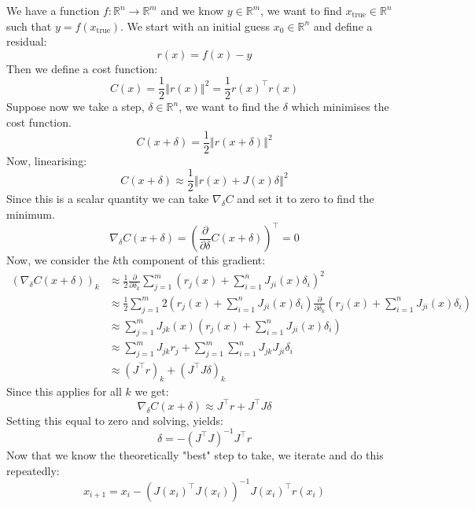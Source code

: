 We have a function $f : \mathbb{R}^n \rightarrow \mathbb{R}^m$ and we know $y \in \mathbb{R}^m$, we want to find $x_{\text{true}} \in \mathbb{R}^n$ such that $y = f(x_{\text{true}})$. We start with an initial guess $x_0 \in \mathbb{R}^n$ and define a residual:
\begin{equation}
  r(x) = f(x) - y
\end{equation}
Then we define a cost function: 
\begin{equation}
  C(x) = \frac{1}{2} \left \Vert r(x) \right \Vert^2 = \frac{1}{2} r(x)^{\top}r(x)
  \label{eq:cost_function}
\end{equation}
Suppose now we take a step, $\delta \in \mathbb{R}^n$, we want to find the $\delta$ which minimises the cost function.
\begin{equation}
  C(x + \delta) = \frac{1}{2} \left\Vert r(x + \delta) \right\Vert^2 
\end{equation}
Now, linearising:
\begin{equation}
  C(x + \delta) \approx \frac{1}{2} \left\Vert r(x) + J(x)\delta \right\Vert^2 
\end{equation}
Since this is a scalar quantity we can take $\nabla_\delta C$ and set it to zero to find the minimum.
\begin{equation}
  \nabla_\delta C(x + \delta) = \left(\frac{\partial}{\partial \delta} C(x + \delta)\right)^\top = 0
\end{equation}
Now, we consider the $k$th component of this gradient:
\begin{align}
  \left(\nabla_\delta C(x + \delta)\right)_k
    &\approx \frac{1}{2}\frac{\partial}{\partial \delta_k} \sum_{j = 1}^{m} \left(r_j(x) + \sum_{i=1}^n J_{ji}(x)\delta_i \right)^2 \\
    &\approx \frac{1}{2} \sum_{j = 1}^m 2\left(r_j(x) + \sum_{i=1}^n J_{ji}(x)\delta_i\right)\frac{\partial}{\partial \delta_k}\left(r_j(x) + \sum_{i=1}^n J_{ji}(x)\delta_i\right) \\
    &\approx \sum_{j = 1}^m J_{jk}(x)\left(r_j(x) + \sum_{i=1}^n J_{ji}(x)\delta_i\right) \\
    &\approx \sum_{j = 1}^m J_{jk} r_j + \sum_{j = 1}^m \sum_{i=1}^n J_{jk} J_{ji}\delta_i \\
    &\approx \left( J^\top r \right)_k + (J^\top J \delta)_k
\end{align}
Since this applies for all $k$ we get:
\begin{equation}
  \nabla_\delta C(x + \delta) \approx J^\top r + J^\top J \delta
\end{equation}
Setting this equal to zero and solving, yields:
\begin{equation}
  \delta = -\left(J^\top J\right)^{-1} J^\top r 
\end{equation}
Now that we know the theoretically "best" step to take, we iterate and do this repeatedly:
\begin{equation}
  x_{i + 1} = x_i - \left(J(x_i)^\top J(x_i)\right)^{-1}J(x_i)^\top r(x_i)
\end{equation}

